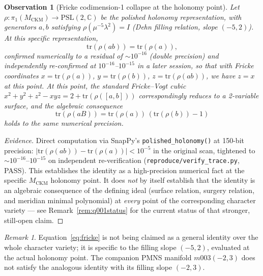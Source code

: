 \documentclass[11pt,a4paper]{article}
\newtheorem{observation}[theorem]{Observation}
\theoremstyle{remark}
\newtheorem{remark}[theorem]{Remark}
\newcommand{\MCKM}{M_{\mathrm{CKM}}}
\newcommand{\CC}{\mathbb{C}}
\newcommand{\PSL}{\mathrm{PSL}(2,\CC)}
\begin{document}
\begin{observation}[Fricke codimension-1 collapse at the holonomy point]
\label{thm:fricke}
Let $\rho: \pi_1(\MCKM) \to \PSL$ be the polished holonomy
representation, with generators $a, b$ satisfying
$\rho(\mu^{-5} \lambda^2) = I$ (Dehn filling relation, slope $(-5,2)$).
At this specific representation,
\begin{equation}
\mathrm{tr}(\rho(ab)) = \mathrm{tr}(\rho(a)),
\label{eq:fricke}
\end{equation}
confirmed numerically to a residual of $\sim 10^{-16}$ (double precision)
and independently re-confirmed at $10^{-16}$--$10^{-15}$ in a later
session, so that with Fricke coordinates $x = \mathrm{tr}(\rho(a))$,
$y = \mathrm{tr}(\rho(b))$, $z = \mathrm{tr}(\rho(ab))$, we have $z = x$
at this point.
At this point, the standard Fricke--Vogt cubic
$x^2 + y^2 + z^2 - xyz = 2 + \mathrm{tr}(\rho([a,b]))$
correspondingly reduces to a 2-variable surface, and the algebraic
consequence
\begin{equation}
\mathrm{tr}(\rho(aB)) = \mathrm{tr}(\rho(a))\,(\mathrm{tr}(\rho(b)) - 1)
\label{eq:fv_reduced}
\end{equation}
holds to the same numerical precision.
\end{observation}

\begin{proof}[Evidence]\sloppy
Direct computation via SnapPy's \texttt{polished\_holonomy()} at
150-bit precision: $|\mathrm{tr}(\rho(ab)) - \mathrm{tr}(\rho(a))| < 10^{-5}$
in the original scan, tightened to $\sim 10^{-16}$--$10^{-15}$ on
independent re-verification (\texttt{reproduce/verify\_trace.py}, PASS).
This establishes the identity as a high-precision numerical fact at the
specific $\MCKM$ holonomy point. It does \emph{not} by itself establish
that the identity is an algebraic consequence of the defining ideal
(surface relation, surgery relation, and meridian minimal polynomial)
at \emph{every} point of the corresponding character variety --- see
Remark~\ref{rem:q001status} for the current status of that stronger,
still-open claim.
\fussy\end{proof}

\begin{remark}
Equation~\eqref{eq:fricke} is not being claimed as a general identity
over the whole character variety;
it is specific to the filling slope $(-5,2)$, evaluated at the actual
holonomy point.
The companion PMNS manifold $m003(-2,3)$ does not satisfy the
analogous identity with its filling slope $(-2,3)$.
\end{remark}
\end{document}
